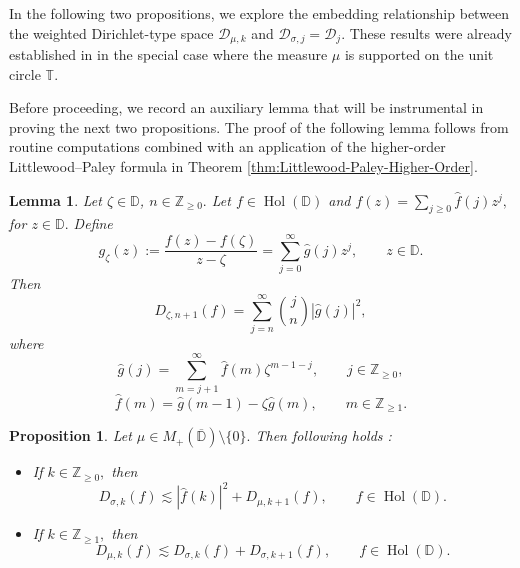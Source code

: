 \documentclass[10pt,oneside,reqno]{amsart}
\newtheorem{lemma}[theorem]{Lemma}
\newtheorem{proposition}[theorem]{Proposition}
\theoremstyle{definition}
\theoremstyle{remark}
\newcommand{\abs}[1]{\left\lvert #1 \right\rvert}
\renewcommand{\ge}{\geqslant}
\newcommand{\Z}{\mathbb Z}
\newcommand{\D}{\mathbb D}
\numberwithin{equation}{section}
\begin{document}
    

In the following two propositions, we explore the embedding relationship between the weighted Dirichlet-type space $\mathscr{D}_{\mu, k}$ and $\mathscr{D}_{\sigma,j}= \mathscr D_j.$ These results were already established in \cite[Proposition 5.5, Proposition 5.7]{Rydhe19} in the special case where the measure $\mu$ is supported on the unit circle $\mathbb T.$ 

Before proceeding, we record an auxiliary lemma that will be instrumental in proving the next two propositions. The proof of the following lemma follows from routine computations combined with an application of the higher-order Littlewood–Paley formula in Theorem  \ref{thm:Littlewood-Paley-Higher-Order}.

\begin{lemma}
    Let $\zeta\in \D$, $n \in \Z_{\ge 0}.$ Let $f \in \operatorname{Hol} (\D)$ and $f(z)= \sum_{j\geqslant 0} \hat{f}(j) z^j,$ for $z\in\D.$ Define 
    \begin{equation*}
        g_{\zeta} (z):= \frac{f(z) - f(\zeta)}{z-\zeta} = \sum_{j =0}^{\infty} \hat{g}(j) z^j, \qquad z \in \D.
    \end{equation*}
    Then 
    \begin{equation*}
        D_{\zeta, n+1} (f) = \sum\limits_{j= n}^{\infty} \binom{j}{n} \abs{\hat{g}(j)}^{2},
    \end{equation*}
    where 
    \begin{equation*}
        \hat{g}(j) = \sum\limits_{m=j+1}^{\infty} \hat{f} (m) \zeta^{m-1-j},\qquad j\in \mathbb Z_{\geqslant 0},
    \end{equation*}  
    \begin{equation*}
        \hat{f} (m) = \hat{g}(m-1)-\zeta \hat{g}(m), \qquad m \in \Z_{\ge 1}.
    \end{equation*}
    \label{lem:local-dirichlet-integral-in-terms-of-coefficients}
\end{lemma}

\begin{proposition}\label{prop:sigma-vs-mu}
    Let $\mu \in M_{+} (\overline{\D})\setminus \{0\}.$ Then following holds :
    \begin{itemize}
        \item[(i)] If $k \in \Z_{\ge 0},$ then
        \begin{equation*}
            D_{\sigma, k} (f) \lesssim \abs{\hat{f} (k)}^2 + D_{\mu, k+1} (f), \qquad f\in \operatorname{Hol}(\D).
        \end{equation*}
        \item[(ii)] If $k\in \mathbb Z_{\geqslant 1},$ then
        \begin{equation*}
         D_{\mu,k}(f) \lesssim D_{\sigma,k}(f) + D_{\sigma, k+1}(f), \qquad f\in \operatorname{Hol}(\D).
        \end{equation*}
    \end{itemize}
\end{proposition}
\end{document}
